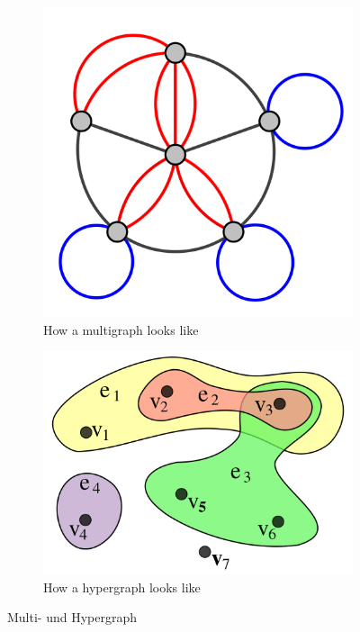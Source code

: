 \documentclass[a4paper]{article}
\begin{document}
\begin{figure}
    \begin{subfigure}{0.3\textwidth}
        \centering
        \includegraphics[width=\textwidth]{Pictures/Multi-pseudograph.svg.png}
        \caption{How a multigraph looks like}
        \label{fig:Multigraph}
    \end{subfigure}
    \hfill
    \begin{subfigure}{0.3\textwidth}
        \centering
        \includegraphics[width=\textwidth]{Pictures/1200px-Hypergraph-wikipedia.svg.png}
         \caption{How a hypergraph looks like}
        \label{fig:Hypergraph}
    \end{subfigure}
\caption{Multi- und Hypergraph}
\label{fig:MultiHyperGraph}
\end{figure}
    
\end{document}

